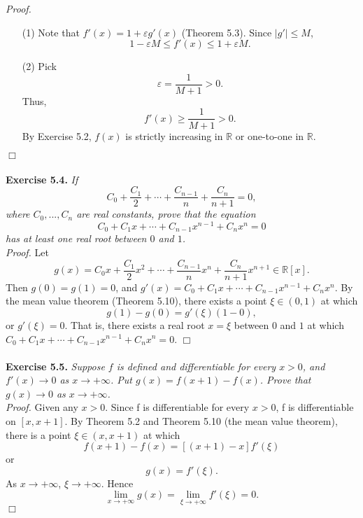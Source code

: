\documentclass{article}
\begin{document}
\emph{Proof.}
\begin{enumerate}
\item[(1)]
Note that
$f'(x) = 1 + \varepsilon g'(x)$ (Theorem 5.3).
Since $|g'|\leq M$,
\[
  1 - \varepsilon M \leq f'(x) \leq 1 + \varepsilon M.
\]

\item[(2)]
Pick
\[
  \varepsilon = \frac{1}{M+1} > 0.
\]
Thus,
\[
  f'(x) \geq \frac{1}{M+1} > 0.
\]
By Exercise 5.2, $f(x)$ is strictly increasing in $\mathbb{R}$ or one-to-one in $\mathbb{R}$.
\end{enumerate}
$\Box$ \\\\






\textbf{Exercise 5.4.}
\emph{If
$$C_0 + \frac{C_1}{2} + \cdots + \frac{C_{n- 1}}{n} + \frac{C_n}{n + 1} = 0,$$
where $C_0, ..., C_n$ are real constants, prove that the equation
$$C_0 + C_1 x + \cdots + C_{n - 1} x^{n - 1} + C_n x^n = 0$$
has at least one real root between $0$ and $1$.} \\

\emph{Proof.}
Let
$$g(x) = C_0 x + \frac{C_1}{2} x^2 + \cdots + \frac{C_{n- 1}}{n} x^n + \frac{C_n}{n + 1} x^{n + 1}
\in \mathbb{R}[x].$$
Then $g(0) = g(1) = 0$, and
$g'(x) = C_0 + C_1 x + \cdots + C_{n - 1} x^{n - 1} + C_n x^n$.
By the mean value theorem (Theorem 5.10), there exists a point $\xi \in (0, 1)$ at which
$$g(1) - g(0) = g'(\xi)(1 - 0),$$
or $g'(\xi) = 0.$ That is, there exists a real root $x = \xi$ between $0$ and $1$
at which $C_0 + C_1 x + \cdots + C_{n - 1} x^{n - 1} + C_n x^n = 0$.
$\Box$ \\\\






\textbf{Exercise 5.5.}
\emph{Suppose $f$ is defined and differentiable for every $x > 0$,
and $f'(x) \to 0$ as $x \to +\infty$.
Put $g(x) = f(x+1) - f(x)$.
Prove that $g(x) \to 0$ as $x \to +\infty$.} \\

\emph{Proof.}
Given any $x > 0$.
Since f is differentiable for every $x > 0$,
f is differentiable on $[x,x+1]$.
By Theorem 5.2 and Theorem 5.10 (the mean value theorem),
there is a point $\xi \in (x,x+1)$ at which
\[
  f(x+1) - f(x) = [(x+1) - x ]f'(\xi)
\]
or
\[
  g(x) = f'(\xi).
\]
As $x \to +\infty$, $\xi \to +\infty$.
Hence
\[
  \lim_{x \to +\infty} g(x)
  = \lim_{\xi \to +\infty} f'(\xi) = 0.
\]
$\Box$ \\\\
\end{document}
